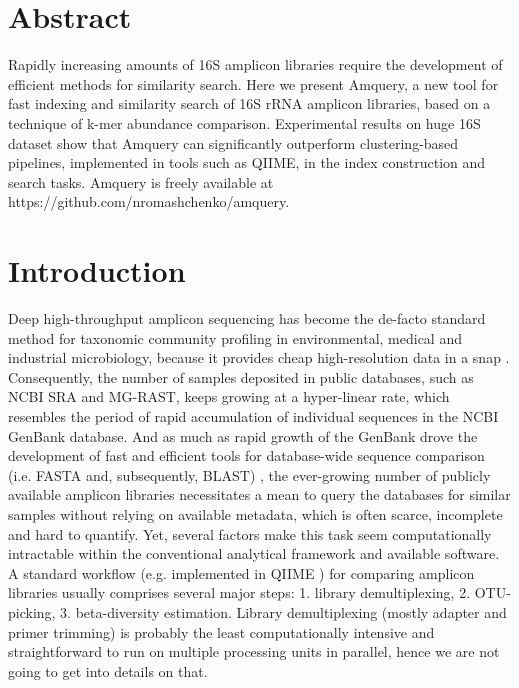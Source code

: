 \documentclass[10pt,letterpaper]{article}
\begin{document}
\section*{Abstract}
Rapidly increasing amounts of 16S amplicon libraries require the development of efficient methods for similarity search. 
Here we present Amquery, a new tool for fast indexing and similarity search of 16S rRNA amplicon libraries, based on a technique of k-mer abundance comparison.
Experimental results on huge 16S dataset show that Amquery can significantly outperform clustering-based pipelines, implemented in tools such as QIIME, in the index construction and search tasks. 
Amquery is freely available at https://github.com/nromashchenko/amquery.

\linenumbers

\section*{Introduction}
Deep high-throughput amplicon sequencing has become the de-facto standard method for taxonomic community profiling in environmental, 
medical and industrial microbiology, because it provides cheap high-resolution data in a snap \cite{}. Consequently, the 
number of samples deposited in public databases, such as NCBI SRA and MG-RAST, keeps growing at a hyper-linear rate, 
which resembles the period of rapid accumulation of individual sequences in the NCBI GenBank database. 
And as much as rapid growth of the GenBank drove the development of fast and efficient tools for database-wide 
sequence comparison (i.e. FASTA and, subsequently, BLAST) \cite{}, the ever-growing number of publicly available amplicon 
libraries necessitates a mean to query the databases for similar samples without relying on available metadata, which is 
often scarce, incomplete and hard to quantify. Yet, several factors make this task seem computationally intractable within 
the conventional analytical framework and available software. A standard workflow (e.g. implemented in QIIME \cite{}) 
for comparing amplicon libraries usually comprises several major steps: 
1. library demultiplexing, 2. OTU-picking, 3. beta-diversity estimation. Library demultiplexing (mostly adapter and primer 
trimming) is probably the least computationally intensive and straightforward to run on multiple processing units in parallel, 
hence we are not going to get into details on that. 
\end{document}
